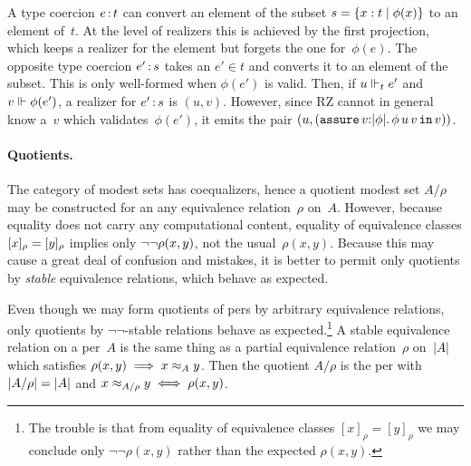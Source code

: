 A type coercion $e\,{:}\,t$ can convert an element of the subset $s =
\{x : t \mid \phi(x)\}$ to an element of~$t$. At the level of
realizers this is achieved by the first projection, which keeps a
realizer for the element but forgets the one for~$\phi(e)$. The
opposite type coercion $e'\,{:}\,s$ takes an $e' \in t$ and converts it
to an element of the subset. This is only well-formed when $\phi(e')$
is valid. Then, if $u \Vdash_t e'$ and $v \Vdash \phi(e')$, a realizer for
$e'\,{:}\,s$ is $(u, v)$. However, since RZ cannot in general know
a~$v$ which validates~$\phi(e')$, it emits the pair $(u,
(\mathtt{assure}\,v{:}|\phi|.\,\phi\,u\,v\,\mathtt{in}\,v))$.

\paragraph{Quotients.}
%
\iflong
%
The category of modest sets has coequalizers, hence a quotient modest
set $A/\rho$ may be constructed for an any equivalence relation~$\rho$
on~$A$. However, because equality does not carry any computational
content, equality of equivalence classes $[x]_{\rho} =
[y]_{\rho}$ implies only $\lnot \lnot \rho(x,y)$, not the
usual~$\rho(x,y)$. Because this may cause a great deal of confusion
and mistakes, it is better to permit only quotients by \emph{stable}
equivalence relations, which behave as expected.

%
\else
%
Even though we may form quotients of pers by arbitrary equivalence
relations, only quotients by $\lnot\lnot$-stable relations behave as
expected.\footnote{The trouble is that from equality of equivalence
  classes $[x]_{\rho} = [y]_{\rho}$ we may conclude only
  $\lnot\lnot\rho(x,y)$ rather than the expected $\rho(x,y)$.}
%
\fi
A stable equivalence relation on a per~$A$ is the same thing as a
partial equivalence relation~$\rho$ on~$|A|$ which satisfies
$\rho(x,y) \implies x \approx_A y$. Then the quotient $A/\rho$ is the per
with $|A/\rho| = |A|$ and $x \approx_{A/\rho} y \iff
\rho(x,y)$.

